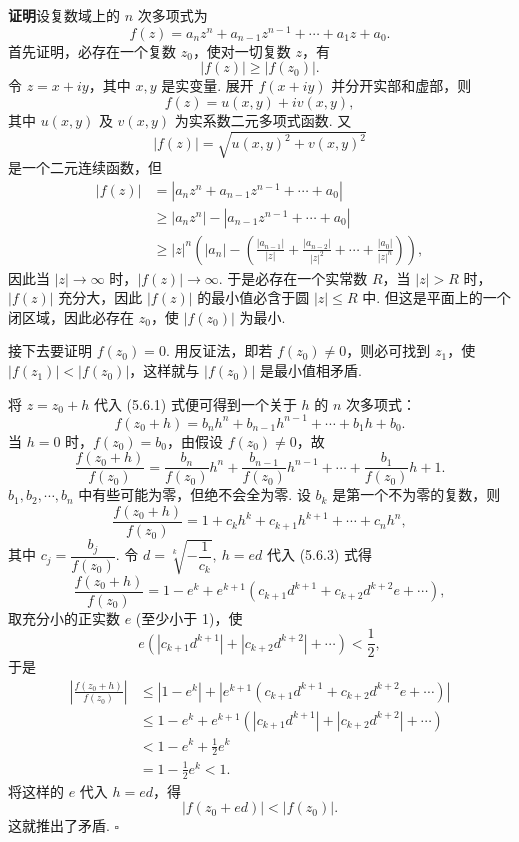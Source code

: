 \documentclass[UTF8, 12pt, fontset=fandol, oneside]{ctexart}
\begin{document}
\noindent\textbf{证明}\quad 设复数域上的 $n$ 次多项式为
\begin{equation}
f(z)=a_nz^n+a_{n-1}z^{n-1}+\cdots+a_1z+a_0.
\tag{5.6.1}
\end{equation}
首先证明，必存在一个复数 $z_0$，使对一切复数 $z$，有
\[
|f(z)|\geq |f(z_0)|.
\]
令 $z=x+iy$，其中 $x,y$ 是实变量. 展开 $f(x+iy)$ 并分开实部和虚部，则
\[
f(z)=u(x,y)+iv(x,y),
\]
其中 $u(x,y)$ 及 $v(x,y)$ 为实系数二元多项式函数. 又
\[
|f(z)|=\sqrt{u(x,y)^2+v(x,y)^2}
\]
是一个二元连续函数，但
\[
\begin{aligned}
|f(z)|&=|a_nz^n+a_{n-1}z^{n-1}+\cdots+a_0|\\
&\geq |a_nz^n|-|a_{n-1}z^{n-1}+\cdots+a_0|\\
&\geq |z|^n\left(|a_n|-\left(\frac{|a_{n-1}|}{|z|}+\frac{|a_{n-2}|}{|z|^2}+\cdots+\frac{|a_0|}{|z|^n}\right)\right),
\end{aligned}
\]
因此当 $|z|\to\infty$ 时，$|f(z)|\to\infty$. 于是必存在一个实常数 $R$，当 $|z|>R$ 时，$|f(z)|$ 充分大，因此 $|f(z)|$ 的最小值必含于圆 $|z|\leq R$ 中. 但这是平面上的一个闭区域，因此必存在 $z_0$，使 $|f(z_0)|$ 为最小.

接下去要证明 $f(z_0)=0$. 用反证法，即若 $f(z_0)\neq 0$，则必可找到 $z_1$，使 $|f(z_1)|<|f(z_0)|$，这样就与 $|f(z_0)|$ 是最小值相矛盾.

将 $z=z_0+h$ 代入 (5.6.1) 式便可得到一个关于 $h$ 的 $n$ 次多项式：
\begin{equation}
f(z_0+h)=b_nh^n+b_{n-1}h^{n-1}+\cdots+b_1h+b_0.
\tag{5.6.2}
\end{equation}
当 $h=0$ 时，$f(z_0)=b_0$，由假设 $f(z_0)\neq 0$，故
\[
\frac{f(z_0+h)}{f(z_0)}=\frac{b_n}{f(z_0)}h^n+\frac{b_{n-1}}{f(z_0)}h^{n-1}+\cdots+\frac{b_1}{f(z_0)}h+1.
\]
$b_1,b_2,\cdots,b_n$ 中有些可能为零，但绝不会全为零. 设 $b_k$ 是第一个不为零的复数，则
\begin{equation}
\frac{f(z_0+h)}{f(z_0)}=1+c_kh^k+c_{k+1}h^{k+1}+\cdots+c_nh^n,
\tag{5.6.3}
\end{equation}
其中 $c_j=\dfrac{b_j}{f(z_0)}$. 令 $d=\sqrt[k]{-\dfrac{1}{c_k}},\ h=ed$ 代入 (5.6.3) 式得
\[
\frac{f(z_0+h)}{f(z_0)}=1-e^k+e^{k+1}(c_{k+1}d^{k+1}+c_{k+2}d^{k+2}e+\cdots),
\]
取充分小的正实数 $e$ (至少小于 1)，使
\[
e(|c_{k+1}d^{k+1}|+|c_{k+2}d^{k+2}|+\cdots)<\frac12,
\]
于是
\[
\begin{aligned}
\left|\frac{f(z_0+h)}{f(z_0)}\right|
&\leq |1-e^k|+|e^{k+1}(c_{k+1}d^{k+1}+c_{k+2}d^{k+2}e+\cdots)|\\
&\leq 1-e^k+e^{k+1}(|c_{k+1}d^{k+1}|+|c_{k+2}d^{k+2}|+\cdots)\\
&<1-e^k+\frac12e^k\\
&=1-\frac12e^k<1.
\end{aligned}
\]
将这样的 $e$ 代入 $h=ed$，得
\[
|f(z_0+ed)|<|f(z_0)|.
\]
这就推出了矛盾. $\square$
\end{document}
